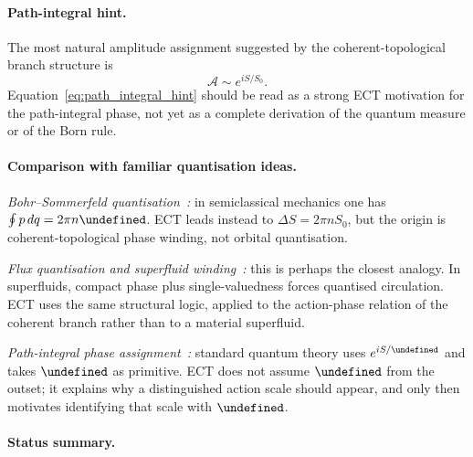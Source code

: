 \documentclass[11pt,a4paper]{article}
\let\hbar\undefined
\numberwithin{equation}{section}
\begin{document}
\paragraph{Path-integral hint.}
The most natural amplitude assignment suggested by the
coherent-topological branch structure is
\begin{equation}
  \mathcal{A} \sim e^{iS/S_0}.
  \label{eq:path_integral_hint}
\end{equation}
Equation~\eqref{eq:path_integral_hint} should be read as a strong
ECT motivation for the path-integral phase, not yet as a complete
derivation of the quantum measure or of the Born rule.

\paragraph{Comparison with familiar quantisation ideas.}

\emph{Bohr--Sommerfeld
quantisation~\cite{LandauLifshitzQM}:}
in semiclassical mechanics one has
$\oint p\,dq = 2\pi n\hbar$.
ECT leads instead to $\Delta S = 2\pi n S_0$, but the origin is
coherent-topological phase winding, not orbital quantisation.

\emph{Flux quantisation and superfluid
winding~\cite{Volovik2003}:}
this is perhaps the closest analogy.
In superfluids, compact phase plus single-valuedness forces
quantised circulation.
ECT uses the same structural logic, applied to the action-phase
relation of the coherent branch rather than to a material
superfluid.

\emph{Path-integral phase
assignment~\cite{FeynmanHibbs1965}:}
standard quantum theory uses $e^{iS/\hbar}$ and takes $\hbar$ as
primitive.
ECT does not assume $\hbar$ from the outset; it explains why a
distinguished action scale should appear, and only then motivates
identifying that scale with $\hbar$.

\paragraph{Status summary.}
\end{document}
